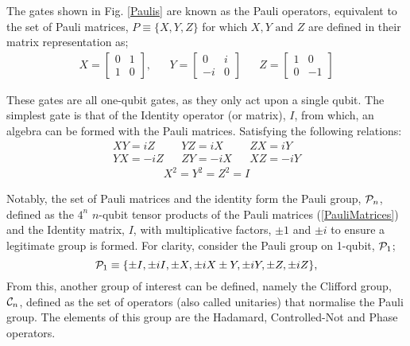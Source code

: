 The gates shown in Fig. \ref{Paulis} are known as the Pauli operators, equivalent
to the set of Pauli matrices, $P \equiv \{X, Y, Z\}$ for which $X, Y \text{ and } Z$ are defined in their matrix representation as;
\begin{align}
    \label{PauliMatrices}
    X = \begin{bmatrix}
            0 & 1 \\
            1 & 0
        \end{bmatrix},
     &  &
    Y = \begin{bmatrix}
            0  & i \\
            -i & 0
        \end{bmatrix}
     &  &
    Z = \begin{bmatrix}
            1 & 0  \\
            0 & -1
        \end{bmatrix}
\end{align}

These gates are all one-qubit gates, as they only act upon a single qubit.
The simplest gate is that of the Identity operator (or matrix), $I$, from which, an algebra
can be formed with the Pauli matrices. Satisfying the following relations:
\begin{align}
    XY = iZ  &  & YZ = iX  &  & ZX = iY  \\
    YX = -iZ &  & ZY = -iX &  & XZ = -iY
\end{align}
\begin{align}
    X^2 = Y^2 = Z^2 = I
\end{align}

Notably, the set of Pauli matrices and the identity form
the Pauli group, ${\cal P}_n$, defined as the $4^n$ $n$-qubit tensor products of the Pauli matrices (\ref{PauliMatrices}) and the
Identity matrix, $I$, with multiplicative factors, $\pm 1$ and $\pm i$ to ensure a legitimate group is formed.
For clarity, consider the Pauli group on 1-qubit, ${\cal P}_1$;
\begin{equation}
    {\cal P}_1 \equiv \{ \pm I, \pm iI, \pm X, \pm iX \pm Y, \pm iY, \pm Z, \pm iZ\},
\end{equation}
From this, another group of interest can be defined, namely the Clifford group, ${\cal C}_n$, defined as the
set of operators (also called unitaries) that normalise the Pauli group. The elements of this group are the
Hadamard, Controlled-Not and Phase operators.

